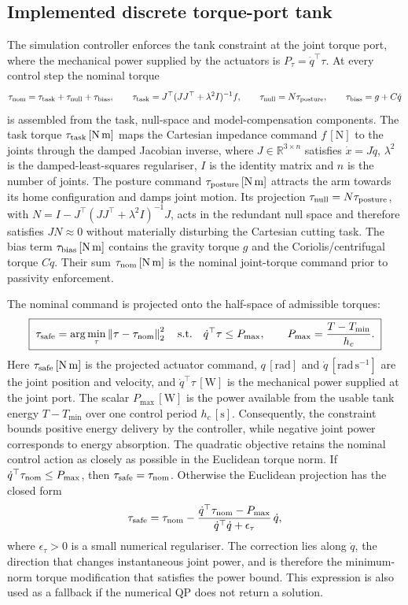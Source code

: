 \documentclass[11pt,a4paper]{article}
\newcommand{\R}{\mathbb{R}}
\newcommand{\norm}[1]{\left\lVert#1\right\rVert}
\newcommand{\unit}[1]{\,[\mathrm{#1}]}
\begin{document}
\subsection{Implemented discrete torque-port tank}
The simulation controller enforces the tank constraint at the joint torque port,
where the mechanical power supplied by the actuators is $P_\tau=\dot q^\top\tau$.
At every control step the nominal torque
\[
\tau_{\rm nom}=\tau_{\rm task}+\tau_{\rm null}+\tau_{\rm bias},
\qquad
\tau_{\rm task}=J^\top(JJ^\top+\lambda^2I)^{-1}f,
\qquad
\tau_{\rm null}=N\tau_{\rm posture},
\qquad
\tau_{\rm bias}=g+C\dot q
\]
is assembled from the task, null-space and model-compensation components.
The task torque $\tau_{\rm task}\unit{N\,m}$ maps the Cartesian impedance
command $f\unit{N}$ to the joints through the damped Jacobian inverse, where
$J\in\R^{3\times n}$ satisfies $\dot x=J\dot q$, $\lambda^2$ is the
damped-least-squares regulariser, $I$ is the identity matrix and $n$ is the
number of joints. The posture command $\tau_{\rm posture}\unit{N\,m}$ attracts
the arm towards its home configuration and damps joint motion. Its projection
$\tau_{\rm null}=N\tau_{\rm posture}$, with
$N=I-J^\top(JJ^\top+\lambda^2I)^{-1}J$, acts in the redundant null space and
therefore satisfies $JN\approx0$ without materially disturbing the Cartesian
cutting task. The bias term $\tau_{\rm bias}\unit{N\,m}$ contains the gravity
torque $g$ and the Coriolis/centrifugal torque $C\dot q$. Their sum
$\tau_{\rm nom}\unit{N\,m}$ is the nominal joint-torque command prior to
passivity enforcement.

The nominal command is projected onto the half-space of admissible torques:
\begin{equation}
\boxed{\;
\tau_{\rm safe}
=\arg\min_{\tau}\norm{\tau-\tau_{\rm nom}}_2^2
\quad\text{s.t.}\quad
\dot q^\top\tau \le P_{\max},\qquad
P_{\max}=\frac{T-T_{\min}}{h_c}. \;}
\label{eq:pass_qp}
\end{equation}
Here $\tau_{\rm safe}\unit{N\,m}$ is the projected actuator command,
$q\unit{rad}$ and $\dot q\unit{rad\,s^{-1}}$ are the joint position and
velocity, and $\dot q^\top\tau\unit{W}$ is the mechanical power supplied at the
joint port. The scalar $P_{\max}\unit{W}$ is the power available from the usable
tank energy $T-T_{\min}$ over one control period $h_c\unit{s}$.
Consequently, the constraint bounds positive energy delivery by the controller,
while negative joint power corresponds to energy absorption. The quadratic
objective retains the nominal control action as closely as possible in the
Euclidean torque norm. If
$\dot q^\top\tau_{\rm nom}\le P_{\max}$, then
$\tau_{\rm safe}=\tau_{\rm nom}$. Otherwise the Euclidean projection has the
closed form
\begin{equation}
\tau_{\rm safe}=\tau_{\rm nom}
-\frac{\dot q^\top\tau_{\rm nom}-P_{\max}}
       {\dot q^\top\dot q+\epsilon_\tau}\,\dot q ,
\label{eq:pass_projection}
\end{equation}
where $\epsilon_\tau>0$ is a small numerical regulariser. The correction lies
along $\dot q$, the direction that changes instantaneous joint power, and is
therefore the minimum-norm torque modification that satisfies the power bound.
This expression is also used as a fallback if the numerical QP does not return
a solution.
\end{document}
